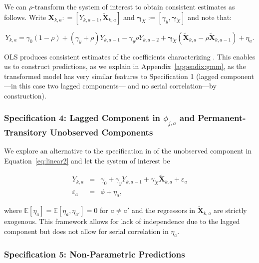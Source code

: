 \noindent We can $\rho$-transform the system of interest to obtain consistent estimates as follows. Write $\bm{X}_{k,a}: = \left[ Y_{k,a-1}, \tilde{\bm{X}}_{k,a} \right]$ and $\bm{\gamma}_{X} := \left[ \gamma_{y},  \bm{\gamma}_{\tilde{X}} \right]$ and note that:

\begin{equation}
Y_{k,a} = \gamma_{0} \left( 1 - \rho \right) + \left( \gamma_{y} + \rho \right) Y_{k,a-1} - \gamma_{y} \rho Y_{k,a-2} + \bm{\gamma}_{\tilde{X}} \left( \tilde{\bm{X}}_{k,a}  -  \rho \tilde{\bm{X}}_{k,a-1} \right) + \eta_{a}. \label{eq:rhotransform}
\end{equation}

\noindent OLS produces consistent estimates of the coefficients characterizing \label{eq:rhotransform}. This enables us to construct predictions, as we explain in Appendix~\ref{appendix:gmm}, as the transformed model has very similar features to Specification 1 (lagged component---in this case two lagged components--- and no serial correlation---by construction).\\

\subsubsection{Specification 4: Lagged Component in $\phi_{j,a}$  and Permanent-Transitory Unobserved Components} \label{app:permtrans}

\noindent We explore an alternative to the specification in of the unobserved component in Equation~\ref{eq:linear2} and let the system of interest be 

\begin{eqnarray}
Y_{k,a} &=&\gamma_{0} + \gamma_{y} Y_{k,a-1} + \gamma_{\tilde{X}} \tilde{\bm{X}}_{k,a} +  \varepsilon_{a}\label{eq:linear1b} \\
\varepsilon_{a} &=& \phi + \eta_{a}, \label{eq:linear2b}
\end{eqnarray}
 
\noindent where $\mathbb{E}[\eta_{a}] = \mathbb{E}[\eta_{a}, \eta_{a'}] = 0$ for $a \neq a'$ and the regressors in $\tilde{\bm{X}}_{k,a}$ are strictly exogenous. This framework allows for lack of independence due to the lagged component but does not allow for serial correlation in $\eta_{a}$.

\subsubsection{Specification 5: Non-Parametric Predictions}

